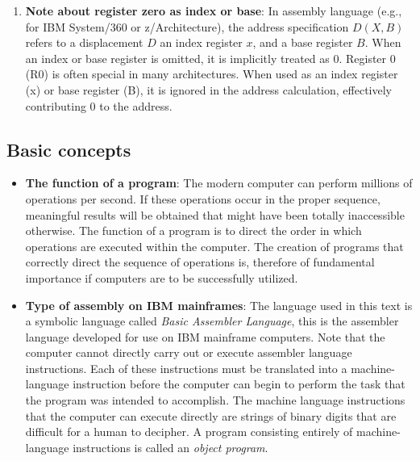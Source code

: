 \documentclass{report}
\begin{document}
\begin{itemize}
\begin{enumerate}
                \item \textbf{Note about register zero as index or base}: In assembly language (e.g., for IBM System/360 or z/Architecture), the address specification $D(X,B)$ refers to a displacement $D$ an index register $x$, and a base register $B$. When an index or base register is omitted, it is implicitly treated as 0.
                    \bigbreak \noindent 
                    Register 0 (R0) is often special in many architectures. When used as an index register (x) or base register (B), it is ignored in the address calculation, effectively contributing 0 to the address.
            \end{enumerate}

            \pagebreak 
            \subsection{Basic concepts}
            \begin{itemize}
                \item \textbf{The function of a program}: The modern computer can perform millions of operations per second. If these operations occur in the proper sequence, meaningful results will be obtained that might have been totally inaccessible otherwise. The function of a program is to direct the order in which operations are executed within the computer.
                    \bigbreak \noindent 
                    The creation of programs that correctly direct the sequence of operations is, therefore of fundamental importance if computers are to be successfully utilized.
                \item \textbf{Type of assembly on IBM mainframes}: The language used in this text is a symbolic language called \textit{Basic Assembler Language}, this is the assembler language developed for use on IBM mainframe computers.
                    \bigbreak \noindent 
                    Note that the computer cannot directly carry out or execute assembler language instructions. Each of these instructions must be translated into a machine-language instruction before the computer can begin to perform the task that the program was intended to accomplish.
                    \bigbreak \noindent 
                    The machine language instructions that the computer can execute directly are strings of binary digits that are difficult for a human to decipher. A program consisting entirely of machine-language instructions is called an \textit{object program}.
                    \bigbreak \noindent 

\end{itemize}
\end{itemize}
\end{document}
